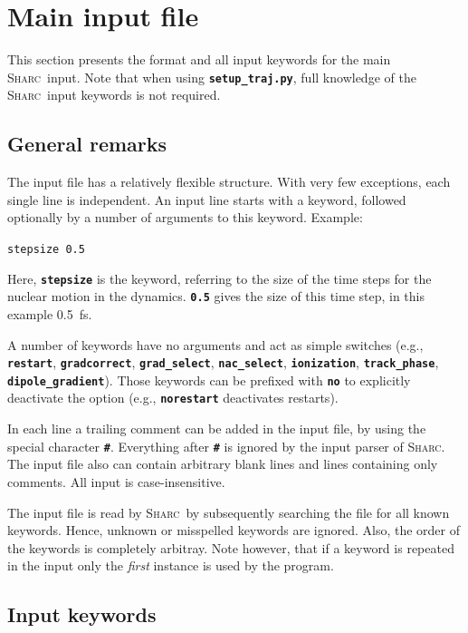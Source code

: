 \documentclass[a4paper,10pt,DIV=15,openany,twoside=false]{scrbook}
\newcommand{\sharc}{\textsc{Sharc}}
\newcommand{\ttt}[1]{\textbf{\texttt{#1}}}
\newenvironment{example}{
  \setlength{\OuterFrameSep}{3pt}
  \vspace{0mm}
  \definecolor{shadecolor}{HTML}{E4F4FF}
  \begin{shaded}
}{
  \end{shaded}
}
\begin{document}
\section{Main input file}\label{sec:inputfile}

This section presents the format and all input keywords for the main \sharc\ input. Note that when using \ttt{setup\_traj.py}, full knowledge of the \sharc\ input keywords is not required.

\subsection{General remarks}

The input file has a relatively flexible structure. With very few exceptions, each single line is independent. An input line starts with a keyword, followed optionally by a number of arguments to this keyword. Example:

\begin{example}
  \verb|stepsize 0.5|
\end{example}

Here, \ttt{stepsize} is the keyword, referring to the size of the time steps for the nuclear motion in the dynamics. \ttt{0.5} gives the size of this time step, in this example 0.5~fs.

A number of keywords have no arguments and act as simple switches (e.g., \ttt{restart}, \ttt{gradcorrect}, \ttt{grad\_select}, \ttt{nac\_select}, \ttt{ionization}, \ttt{track\_phase}, \ttt{dipole\_gradient}). Those keywords can be prefixed with \ttt{no} to explicitly deactivate the option (e.g., \ttt{norestart} deactivates restarts).

In each line a trailing comment can be added in the input file, by using the special character \ttt{\#}. Everything after \ttt{\#} is ignored by the input parser of \sharc. The input file also can contain arbitrary blank lines and lines containing only comments. All input is case-insensitive.

The input file is read by \sharc\ by subsequently searching the file for all known keywords. Hence, unknown or misspelled keywords are ignored. Also, the order of the keywords is completely arbitray. Note however, that if a keyword is repeated in the input only the \textit{first} instance is used by the program. 

\subsection{Input keywords}
\end{document}
